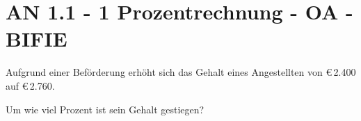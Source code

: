 \section{AN 1.1 - 1 Prozentrechnung - OA - BIFIE}


\begin{beispiel}[AN 1.1]{1} %
Aufgrund einer Beförderung erhöht sich das Gehalt eines Angestellten von \euro\,2.400 auf \euro\,2.760.
\leer

Um wie viel Prozent ist sein Gehalt gestiegen? 

\end{beispiel}